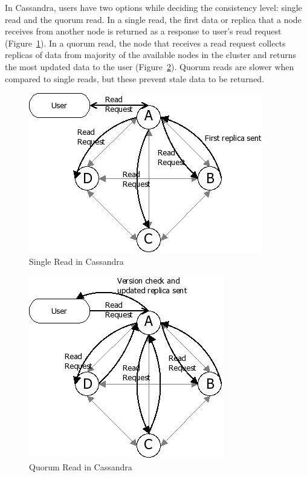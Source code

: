 \begin{description}
  
  In Cassandra, users have two options while deciding the consistency level:
  single read and the quorum read. In a single read, the first data or replica
  that a node receives from another node is returned as a response to user's
  read request (Figure~\ref{f:singleread}). In a  quorum read, the node that
  receives a read request collects   replicas of data from majority of the available nodes in
  the cluster and returns the most updated data to the user (Figure~\ref{f:quorumread}).
  Quorum reads are slower when compared to single reads, but these prevent stale
  data to be returned.
  
    
  		 \begin{figure}[H]
			\centering
			\includegraphics[width=.5\textwidth]{./figure/Solutions/Single-Read-Cassandra.png}
		
			\caption{Single Read in Cassandra}\label{f:singleread}
		\end{figure}
 
		 \begin{figure}[H]
			\centering
			\includegraphics[width=.4\textwidth]{./figure/Solutions/Quorum-read-Cassandra.png}
		
			\caption{Quorum Read in Cassandra}\label{f:quorumread}
		\end{figure}



\end{description}

